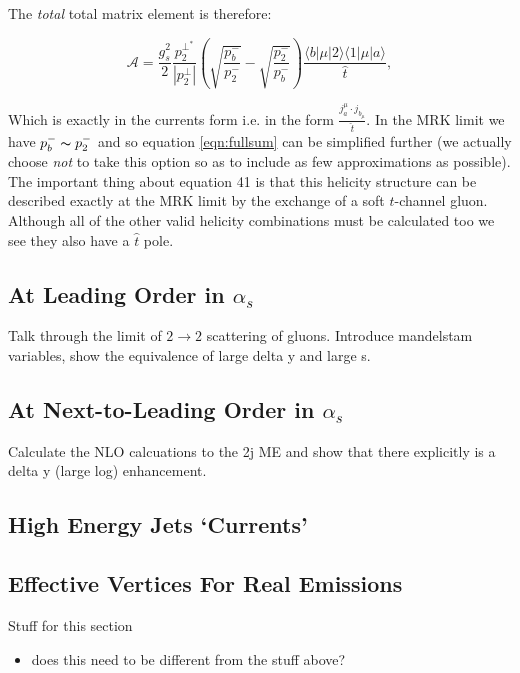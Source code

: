 			The \emph{total} total matrix element is therefore:

			\begin{equation}
			\mathcal{A}=\frac{g_s^2}{2}\frac{p_2^{\perp^*}}{|p_2^\perp|}\left(\sqrt{\frac{p_b^-}{p_2^-}}-\sqrt{\frac{p_2^-}{p_b^-}}\right)\frac{\langle{b}|\mu|2\rangle\langle{1}|\mu|a\rangle}{\hat{t}},
			\label{eqn:fullsum}
			\end{equation}

			Which is exactly in the currents form i.e. in the form $\frac{j_a^\mu\cdot j_{b_\mu}}{\hat{t}}$.  In the MRK
			limit we have $p_b^-\thicksim p_2^-$ and so equation \ref{eqn:fullsum} can be simplified further (we actually
			choose \emph{not} to take this option so as to include as few approximations as possible).  The important
			thing about equation 41 is that this helicity structure can be described exactly at the MRK limit by the
			exchange of a soft $t$-channel gluon.  Although all of the other valid helicity combinations must be
			calculated too we see they also have a $\hat t$ pole.

	\subsection{At Leading Order in $\alpha_s$}
	\label{sub:HE22_LO}

		Talk through the limit of $2\rightarrow2$ scattering of gluons.  Introduce mandelstam
		variables, show the equivalence of large delta y and large s.

	\subsection{At Next-to-Leading Order in $\alpha_s$}
	\label{sub:HE22_NLO}

		Calculate the NLO calcuations to the 2j ME and show that there explicitly is a delta y (large log) enhancement.

	\subsection{High Energy Jets `Currents'}
	\label{sub:currents}

	\subsection{Effective Vertices For Real Emissions}
	\label{sub:effective_vertices_for_real_emissions}

{\color{red}
Stuff for this section
\begin{itemize}
	\item does this need to be different from the stuff above?
\end{itemize}
}

